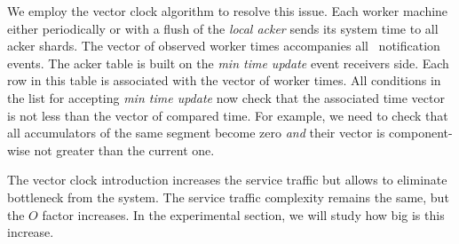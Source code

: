 We employ the vector clock algorithm to resolve this issue. Each worker machine either periodically or with a flush of the \textit{local acker} sends its system time to all acker shards. The vector of observed worker times accompanies all \tracker\ notification events. The acker table is built on the \textit{min time update} event receivers side. Each row in this table is associated with the vector of worker times. All conditions in the list for accepting \textit{min time update} now check that the associated time vector is not less than the vector of compared time. For example, we need to check that all accumulators of the same segment become zero \textit{and} their vector is component-wise not greater than the current one.

The vector clock introduction increases the service traffic but allows to eliminate bottleneck from the system. The service traffic complexity remains the same, but the $O$ factor increases. In the experimental section, we will study how big is this increase.


